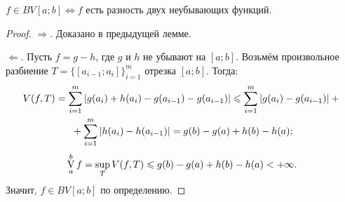 \begin{theorem}
    $f \in BV[a; b] \Leftrightarrow f$ есть разность двух неубывающих функций.
\end{theorem}

\begin{proof}
    $\Rightarrow$. Доказано в предыдущей лемме.

    $\Leftarrow$. Пусть $f = g - h$, где $g$ и $h$ не убывают на $[a; b]$. Возьмём произвольное разбиение $T = \{[a_{i - 1}; a_i]\}_{i = 1}^m$ отрезка $[a; b]$. Тогда:
    \begin{multline*}
        V(f, T) = \sum_{i = 1}^m\left\lvert g(a_i) + h(a_i) - g(a_{i - 1}) - g(a_{i - 1})\right\rvert \leqslant \sum_{i = 1}^m\left\lvert g(a_i) - g(a_{i - 1})\right\rvert + {}\\{} + \sum_{i = 1}^m\left\lvert h(a_i) - h(a_{i - 1})\right\rvert = g(b) - g(a) + h(b) - h(a);
    \end{multline*}
    \[
        \operatorname*{V}\limits_a^bf = \sup\limits_TV(f, T) \leqslant g(b) - g(a) + h(b) - h(a) < +\infty.
    \]
    Значит, $f \in BV[a; b]$ по определению.
\end{proof}

